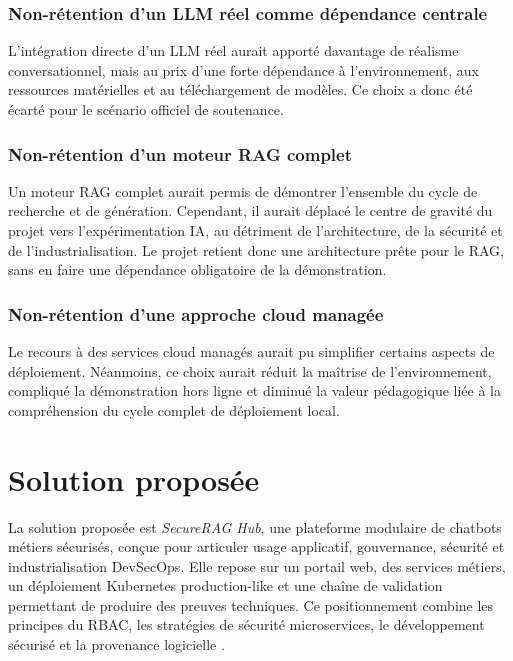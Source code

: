 \subsubsection{Non-rétention d’un LLM réel comme dépendance centrale}

L’intégration directe d’un LLM réel aurait apporté davantage de réalisme conversationnel, mais au prix d’une forte dépendance à l’environnement, aux ressources matérielles et au téléchargement de modèles. Ce choix a donc été écarté pour le scénario officiel de soutenance.

\subsubsection{Non-rétention d’un moteur RAG complet}

Un moteur RAG complet aurait permis de démontrer l’ensemble du cycle de recherche et de génération. Cependant, il aurait déplacé le centre de gravité du projet vers l’expérimentation IA, au détriment de l’architecture, de la sécurité et de l’industrialisation. Le projet retient donc une architecture prête pour le RAG, sans en faire une dépendance obligatoire de la démonstration.

\subsubsection{Non-rétention d’une approche cloud managée}

Le recours à des services cloud managés aurait pu simplifier certains aspects de déploiement. Néanmoins, ce choix aurait réduit la maîtrise de l’environnement, compliqué la démonstration hors ligne et diminué la valeur pédagogique liée à la compréhension du cycle complet de déploiement local.

\section{Solution proposée}

La solution proposée est \textit{SecureRAG Hub}, une plateforme modulaire de chatbots métiers sécurisés, conçue pour articuler usage applicatif, gouvernance, sécurité et industrialisation DevSecOps. Elle repose sur un portail web, des services métiers, un déploiement Kubernetes production-like et une chaîne de validation permettant de produire des preuves techniques. Ce positionnement combine les principes du RBAC, les stratégies de sécurité microservices, le développement sécurisé et la provenance logicielle \cite{sandhu_rbac_1996,nist_sp_800_204,nist_ssdf_800_218,slsa_spec_v1}.

